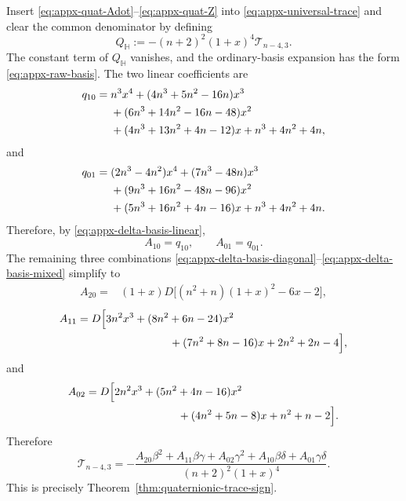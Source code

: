 \documentclass[11pt,reqno]{amsart}
\numberwithin{equation}{section}
\theoremstyle{definition}
\theoremstyle{remark}
\begin{document}
Insert \eqref{eq:appx-quat-Adot}--\eqref{eq:appx-quat-Z} into
\eqref{eq:appx-universal-trace} and clear the common denominator by defining
\begin{equation}
Q_{\mathbb H}
:=-(n+2)^2(1+x)^4\mathscr T_{n-4,3}.
\label{eq:appx-quat-Q}
\end{equation}
The constant term of $Q_{\mathbb H}$ vanishes, and the ordinary-basis
expansion has the form \eqref{eq:appx-raw-basis}.  The two linear coefficients
are
\begin{align}
q_{10}
={}&n^3x^4+(4n^3+5n^2-16n)x^3\notag\\
&+(6n^3+14n^2-16n-48)x^2\notag\\
&+(4n^3+13n^2+4n-12)x+n^3+4n^2+4n,
\label{eq:appx-quat-q10}
\end{align}
and
\begin{align}
q_{01}
={}&(2n^3-4n^2)x^4+(7n^3-48n)x^3\notag\\
&+(9n^3+16n^2-48n-96)x^2\notag\\
&+(5n^3+16n^2+4n-16)x+n^3+4n^2+4n.
\label{eq:appx-quat-q01}
\end{align}
Therefore, by \eqref{eq:appx-delta-basis-linear},
\[
A_{10}=q_{10},\qquad A_{01}=q_{01}.
\]
The remaining three combinations
\eqref{eq:appx-delta-basis-diagonal}--\eqref{eq:appx-delta-basis-mixed}
simplify to
\begin{align}
A_{20}
={}&(1+x)D\Big[(n^2+n)(1+x)^2-6x-2\Big],
\label{eq:appx-quat-A20}
\end{align}
\begin{align}
A_{11}
={}&D\Big[3n^2x^3+(8n^2+6n-24)x^2\notag\\
&\hspace{2.5cm}+(7n^2+8n-16)x+2n^2+2n-4\Big],
\label{eq:appx-quat-A11}
\end{align}
and
\begin{align}
A_{02}
={}&D\Big[2n^2x^3+(5n^2+4n-16)x^2\notag\\
&\hspace{2.5cm}+(4n^2+5n-8)x+n^2+n-2\Big].
\label{eq:appx-quat-A02}
\end{align}
Therefore
\begin{equation}
\mathscr T_{n-4,3}
=-\frac{
A_{20}\beta^2+A_{11}\beta\gamma+A_{02}\gamma^2
+A_{10}\beta\delta+A_{01}\gamma\delta
}{(n+2)^2(1+x)^4}.
\label{eq:appx-quat-final}
\end{equation}
This is precisely Theorem~\ref{thm:quaternionic-trace-sign}.
\end{document}
